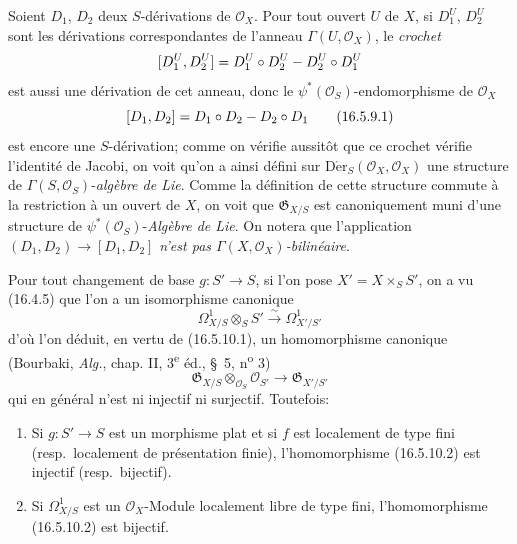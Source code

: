 \begin{env}[16.5.9]
\label{IV.16.5.9}
Soient $D_1$, $D_2$ deux $S$-dérivations de $\mathcal{O}_X$. Pour tout ouvert
$U$ de $X$, si $D_1^U$, $D_2^U$ sont les dérivations correspondantes de
l'anneau $\Gamma(U,\mathcal{O}_X)$, le \emph{crochet}
\[
  [D_1^U,D_2^U]=D_1^U\circ D_2^U- D_2^U\circ D_1^U
\]
est aussi une dérivation de cet anneau, donc le
$\psi^*(\mathcal{O}_S)$-endomorphisme de $\mathcal{O}_X$
\[
  [D_1,D_2]=D_1\circ D_2- D_2\circ D_1
  \tag{16.5.9.1}
  \label{IV.16.5.9.1}
\]
est encore une $S$-dérivation; comme on vérifie aussitôt que ce crochet
vérifie l'identité de Jacobi, on voit qu'on a ainsi défini sur
$\operatorname{D\acute{e}r}_S(\mathcal{O}_X,\mathcal{O}_X)$ une structure de
$\Gamma(S,\mathcal{O}_S)$-\emph{algèbre de Lie}. Comme la définition de cette
structure commute à la restriction à un ouvert de $X$, on voit que
$\mathfrak{G}_{X/S}$ est canoniquement muni d'une structure de
$\psi^*(\mathcal{O}_S)$-\emph{Algèbre de Lie}. On notera que l'application
$(D_1,D_2)\to[D_1,D_2]$ \emph{n'est pas
$\Gamma(X,\mathcal{O}_X)$-bilinéaire}.
\end{env}

\begin{env}[16.5.10]
\label{IV.16.5.10}
Pour tout changement de base $g:S'\to S$, si l'on pose $X'=X\times_S S'$, on
a vu (16.4.5) que l'on a un isomorphisme canonique
\[
  \varOmega_{X/S}^1\otimes_S S'\xrightarrow{\sim}\varOmega_{X'/S'}^1
  \tag{16.5.10.1}
  \label{IV.16.5.10.1}
\]
d'où l'on déduit, en vertu de (16.5.10.1), un homomorphisme canonique
(Bourbaki, \emph{Alg.}, chap. II, 3\textsuperscript{e} éd., \S~5,
n\textsuperscript{o} 3)
\[
  \mathfrak{G}_{X/S}\otimes_{\mathcal{O}_S}\mathcal{O}_{S'}
  \longrightarrow\mathfrak{G}_{X'/S'}
  \tag{16.5.10.2}
  \label{IV.16.5.10.2}
\]
qui en général n'est ni injectif ni surjectif. Toutefois:
\end{env}

\begin{proposition}[16.5.11]
\label{IV.16.5.11}
\begin{enumerate}
\item[\textup{(i)}] Si $g:S'\to S$ est un morphisme plat et si $f$ est localement de
type fini \textup{(resp.}\ localement de présentation finie\textup{)}, l'homomorphisme
\textup{(16.5.10.2)} est injectif \textup{(resp.}\ bijectif\textup{)}.
\item[\textup{(ii)}] Si $\varOmega_{X/S}^1$ est un $\mathcal{O}_X$-Module localement libre
de type fini, l'homomorphisme \textup{(16.5.10.2)} est bijectif.
\end{enumerate}
\end{proposition}

